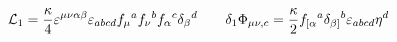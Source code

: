 \begin{equation}
{\cal L}_1 = \frac{\kappa}{4} \varepsilon^{\mu\nu\alpha\beta}
\varepsilon_{abcd} f_\mu{}^a f_\nu{}^b f_\alpha{}^c \delta_\beta{}^d
\qquad \delta_1 \Phi_{\mu\nu,c} = \frac{\kappa}{2} f_{[\alpha}{}^a
\delta_{\beta]}{}^b \varepsilon_{abcd} \eta^d
\end{equation}

